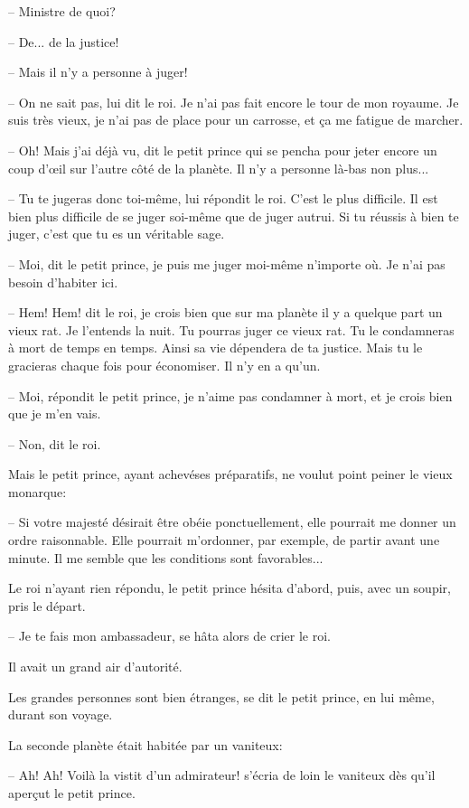 \documentclass[a4paper]{report}
\begin{document}
-- Ministre de quoi?

-- De... de la justice!

-- Mais il n'y a personne à juger!

-- On ne sait pas, lui dit le roi. Je n'ai pas fait encore le tour de mon royaume. Je suis très vieux, je n'ai pas de place pour un carrosse, et ça me fatigue de marcher.

-- Oh! Mais j'ai déjà vu, dit le petit prince qui se pencha pour jeter encore un coup d'œil sur l'autre côté de la planète. Il n'y a personne là-bas non plus...

-- Tu te jugeras donc toi-même, lui répondit le roi. C'est le plus difficile. Il est bien plus difficile de se juger soi-même que de juger autrui. Si tu réussis à bien te juger, c'est que tu es un véritable sage.

-- Moi, dit le petit prince, je puis me juger moi-même n'importe où. Je n'ai pas besoin d'habiter ici.

-- Hem! Hem! dit le roi, je crois bien que sur ma planète il y a quelque part un vieux rat. Je l'entends la nuit. Tu pourras juger ce vieux rat. Tu le condamneras à mort de temps en temps. Ainsi sa vie dépendera de ta justice. Mais tu le gracieras chaque fois pour économiser. Il n'y en a qu'un.

-- Moi, répondit le petit prince, je n'aime pas condamner à mort, et je crois bien que je m'en vais.

-- Non, dit le roi.

Mais le petit prince, ayant achevéses préparatifs, ne voulut point peiner le vieux monarque:

-- Si votre majesté désirait être obéie ponctuellement, elle pourrait me donner un ordre raisonnable. Elle pourrait m'ordonner, par exemple, de partir avant une minute. Il me semble que les conditions sont favorables...

Le roi n'ayant rien répondu, le petit prince hésita d'abord, puis, avec un soupir, pris le départ.

-- Je te fais mon ambassadeur, se hâta alors de crier le roi.

Il avait un grand air d'autorité.

Les grandes personnes sont bien étranges, se dit le petit prince, en lui même, durant son voyage.

\parachapter{} %

La seconde planète était habitée par un vaniteux:

-- Ah! Ah! Voilà la vistit d'un admirateur! s'écria de loin le vaniteux dès qu'il aperçut le petit prince. 
\end{document}
